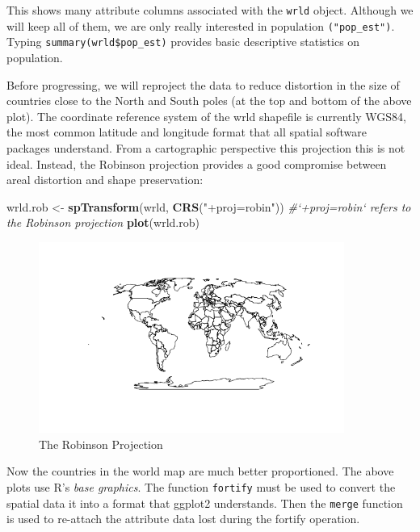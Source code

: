 \documentclass[]{article}
\newenvironment{Shaded}{}{}
\newcommand{\KeywordTok}[1]{\textcolor[rgb]{0.00,0.44,0.13}{\textbf{{#1}}}}
\newcommand{\StringTok}[1]{\textcolor[rgb]{0.25,0.44,0.63}{{#1}}}
\newcommand{\CommentTok}[1]{\textcolor[rgb]{0.38,0.63,0.69}{\textit{{#1}}}}
\newcommand{\NormalTok}[1]{{#1}}
\let\Oldincludegraphics\includegraphics
\renewcommand{\includegraphics}[1]{\Oldincludegraphics[width=10cm]{#1}}
\begin{document}
This shows many attribute columns associated with the \texttt{wrld}
object. Although we will keep all of them, we are only really interested
in population \texttt{("pop\_est")}. Typing
\texttt{summary(wrld\$pop\_est)} provides basic descriptive statistics
on population.

Before progressing, we will reproject the data to reduce distortion in
the size of countries close to the North and South poles (at the top and
bottom of the above plot). The coordinate reference system of the wrld
shapefile is currently WGS84, the most common latitude and longitude
format that all spatial software packages understand. From a
cartographic perspective this projection this is not ideal. Instead, the
Robinson projection provides a good compromise between areal distortion
and shape preservation:

\begin{Shaded}
\begin{Highlighting}[]
\NormalTok{wrld.rob <- }\KeywordTok{spTransform}\NormalTok{(wrld, }\KeywordTok{CRS}\NormalTok{(}\StringTok{"+proj=robin"}\NormalTok{))  }\CommentTok{#`+proj=robin` refers to the Robinson projection}
\KeywordTok{plot}\NormalTok{(wrld.rob)}
\end{Highlighting}
\end{Shaded}

\begin{figure}[htbp]
\centering
\includegraphics{figure/The_Robinson_Projection.png}
\caption{The Robinson Projection}
\end{figure}

Now the countries in the world map are much better proportioned. The
above plots use R's \emph{base graphics}. The function \texttt{fortify}
must be used to convert the spatial data it into a format that ggplot2
understands. Then the \texttt{merge} function is used to re-attach the
attribute data lost during the fortify operation.
\end{document}

